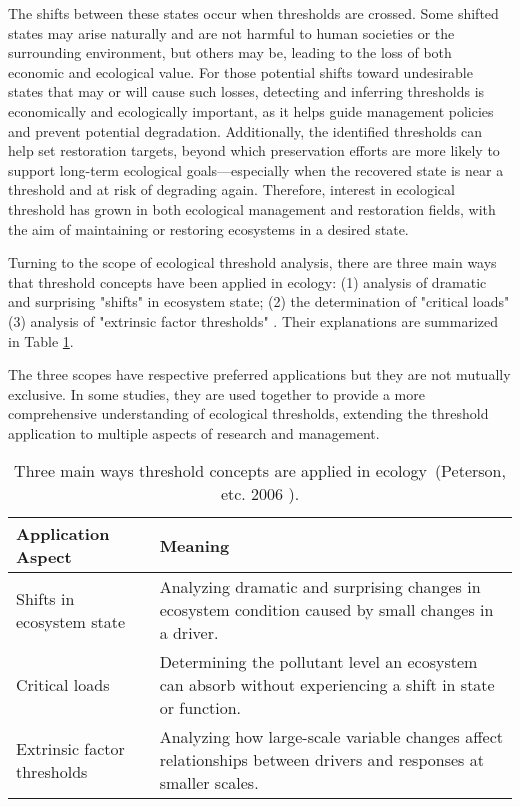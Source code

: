 The shifts between these states occur when thresholds are crossed. 
Some shifted states may arise naturally and are not harmful to human societies
or the surrounding environment, but others may be, leading to the loss of both 
economic and ecological value.
For those potential shifts toward undesirable states that may or will cause 
such losses, detecting and inferring thresholds is economically and ecologically important, 
as it helps guide management policies and prevent potential degradation. 
Additionally, the identified thresholds can help set restoration targets,
beyond which preservation efforts are more likely to support long-term ecological 
goals—especially when the recovered state is near a threshold and at risk of degrading again.
Therefore, interest in ecological threshold has grown in both ecological management and 
restoration fields, with the aim of maintaining or restoring ecosystems in a desired state.


Turning to the scope of ecological threshold analysis, there are three main ways that threshold concepts have been applied in ecology:
(1) analysis of dramatic and surprising "shifts" in ecosystem state; 
(2) the determination of "critical loads"
(3) analysis of "extrinsic factor thresholds"
\cite{peterson2006ecological}. Their explanations are summarized in Table \ref{tab:thresholds_application_scopes}.

The three scopes have respective preferred applications but they are not mutually exclusive. In some studies,
they are used together to provide a more comprehensive understanding of ecological thresholds, extending the
threshold application to multiple aspects of research and management.

\begin{table}[ht]
\centering
\caption{Three main ways threshold concepts are applied in ecology~(Peterson, etc. 2006 \cite{peterson2006ecological}).}
\label{tab:thresholds_application_scopes}
\renewcommand{\arraystretch}{1.8} %
\begin{tabular}{>{\centering\arraybackslash}p{4.5cm} >{\centering\arraybackslash}p{9.5cm}}
\hline
\textbf{Application Aspect} & \textbf{Meaning} \\
\hline
Shifts in ecosystem state & Analyzing dramatic and surprising changes in ecosystem condition caused by small changes in a driver. \\
\hline
Critical loads & Determining the pollutant level an ecosystem can absorb without experiencing a shift in state or function. \\
\hline
Extrinsic factor thresholds & Analyzing how large-scale variable changes affect relationships between drivers and responses at smaller scales. \\
\hline
\end{tabular}
\end{table}

